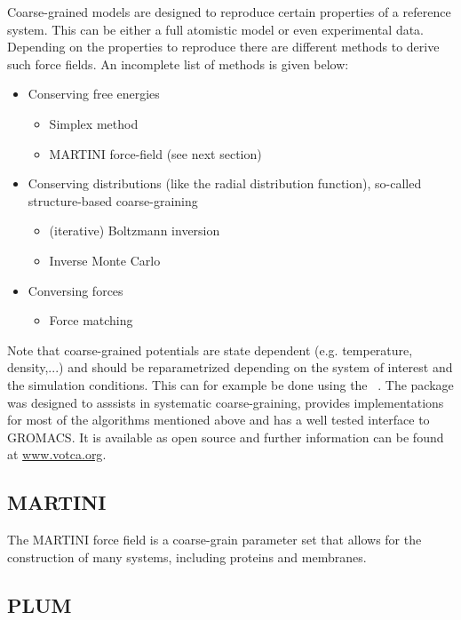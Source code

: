 Coarse-grained models are designed to reproduce certain properties of a reference system. This can be either a full atomistic model or even experimental data. Depending on the properties to reproduce there are different methods to derive such force fields. An incomplete list of methods is given below:
\begin{itemize}
\item Conserving free energies
\begin{itemize}
\item Simplex method
\item MARTINI force-field (see next section)
\end{itemize}
\item Conserving distributions (like the radial distribution function), so-called structure-based coarse-graining
\begin{itemize}
\item (iterative) Boltzmann inversion
\item Inverse Monte Carlo
\end{itemize}
\item Conversing forces
\begin{itemize}
\item Force matching
\end{itemize}
\end{itemize}

Note that coarse-grained potentials are state dependent (e.g. temperature, density,...) and should be reparametrized depending on the system of interest and the simulation conditions. This can for example be done using the ~\cite{ruehle2009}. The package was designed to asssists in systematic coarse-graining, provides implementations for most of the algorithms mentioned above and has a well tested interface to GROMACS. It is available as open source and further information can be found at \href{http://www.votca.org}{www.votca.org}.

\subsection{MARTINI}

The MARTINI force field is a coarse-grain parameter set that allows for the construction 
of many systems, including proteins and membranes.

\subsection{PLUM}


